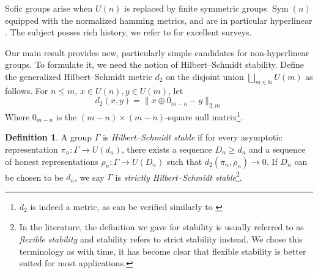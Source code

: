 \documentclass[11pt]{amsart}
\DeclareMathOperator{\Sym}{Sym}
\DeclareMathOperator{\Sp}{Sp}
\newcommand{\N}{{\mathbb{N}}}
\newcommand{\Z}{{\mathbb{Z}}}
\theoremstyle{definition}
\newtheorem{definition}[theorem]{Definition}
\theoremstyle{remark}
\theoremstyle{definition}
\begin{document}
Sofic groups arise when $U(n)$ is replaced by finite symmetric groups $\Sym (n)$ equipped with the normalized hamming metrics, and are in particular hyperlinear \cite{elek2005hyperlinearity}.
The subject posses rich history, we refer to \cite{pestov2008hyperlinear, ThomICM} for excellent surveys.  %

Our main result provides new, particularly simple candidates for non-hyperlinear groups.
To formulate it, we need the notion of  Hilbert--Schmidt stability.
Define the generalized Hilbert--Schmidt metric $d_2$ on the disjoint union $\bigsqcup_{m \in \N} U(m)$  as follows.
For $n\leq m$, $x \in U(n), y \in U(m)$, let
\begin{equation*}
     d_2(x,y) = \| x \oplus 0 _{m-n} - y \|_{2,m}
     \end{equation*}
Where $0_{m-n}$ is the $(m-n) \times (m-n)$-square null matrix\footnote{$d_2$ is indeed a metric, as can be verified similarly to \cite[Lemma A.1]{BC}}.
\begin{definition}
     A group $\Gamma$ is \emph{Hilbert--Schmidt stable} \cite{BL}  if for every asymptotic representation $\pi_n:\Gamma\to U(d_n)$, there exists a sequence $D_n \geq d_n$ and a sequence of honest representations $\rho_n:\Gamma\to U(D_n)$ such that $d_2(\pi_n,\rho_n)\to 0$.
If $D_n$ can be chosen to be $d_n$, we say $\Gamma$ is \emph{strictly Hilbert--Schmidt stable}\footnote{In the literature, the definition we gave for stability is usually referred to as \emph{flexible stability}
and stability refers to strict stability instead. We chose this terminology as with time, it has become clear that flexible stability is better suited for most applications.}. 
\end{definition}
\end{document}
